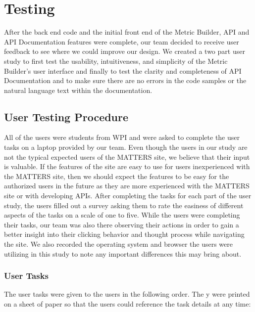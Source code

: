 \chapter{Testing}

	After the back end code and the initial front end of the Metric Builder, 
	API and API Documentation features were complete, our team decided to receive 
	user feedback to see where we could improve our design. We created a two part 
	user study to first test the usability, intuitiveness, and simplicity of the 
	Metric Builder's user interface and finally to test the clarity and completeness 
	of API Documentation and to make sure there are no errors in the code samples 
	or the natural language text within the documentation. 

	\section{User Testing Procedure}

		All of the users were students from WPI and were asked to complete the user tasks on a 
		laptop provided by our team. Even though the users in our study are not the typical 
		expected users of the MATTERS site, we believe that their input is valuable. 
		If the features of the site are easy to use for users inexperienced with the MATTERS site, 
		then we should expect the features to be easy for the authorized users in the future as they 
		are more experienced with the MATTERS site or with developing APIs. After completing the tasks 
		for each part of the user study, the users filled out a survey asking them to rate the 
		easiness of different aspects of the tasks on a scale of one to five. While the users were 
		completing their tasks, our team was also there observing their actions in order to gain a better 
		insight into their clicking behavior and thought process while navigating the site. 
		We also recorded the operating system and browser the users were utilizing in this study to 
		note any important differences this may bring about.

		\subsection{User Tasks} 
		
			The user tasks were given to the users in the following order. The y were printed on a 
			sheet of paper so that the users could reference the task details at any time:
			
